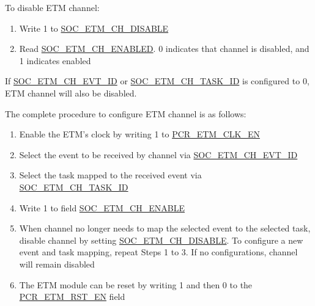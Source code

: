 \documentclass[main\_\_EN.tex]{subfiles}
\begin{document}
To disable ETM channel:
\begin{enumerate}
    \item Write 1 to \hyperref[fielddesc:SOCETMCHDISABLE0]{SOC\_ETM\_CH\_DISABLE}
    \item Read \hyperref[fielddesc:SOCETMCHENABLED0]{SOC\_ETM\_CH\_ENABLED}. 0 indicates that channel is disabled, and 1 indicates enabled
\end{enumerate}

If \hyperref[fielddesc:SOCETMCH0EVTID]{SOC\_ETM\_CH\_EVT\_ID}  or  \hyperref[fielddesc:SOCETMCH0TASKID]{SOC\_ETM\_CH\_TASK\_ID} is configured to 0, ETM channel will also be disabled.

The complete procedure to configure ETM channel is as follows:
\begin{enumerate}
    \item Enable the ETM's clock by writing 1 to \hyperref[fielddesc:PCRETMCLKEN]{PCR\_ETM\_CLK\_EN}
    \item Select the event to be received by channel via \hyperref[fielddesc:SOCETMCH0EVTID]{SOC\_ETM\_CH\_EVT\_ID}
    \item Select the task mapped to the received event via  \hyperref[fielddesc:SOCETMCH0TASKID]{SOC\_ETM\_CH\_TASK\_ID}
    \item Write 1 to field \hyperref[fielddesc:SOCETMCHENABLE0]{SOC\_ETM\_CH\_ENABLE}
    \item When channel no longer needs to map the selected event to the selected task, disable channel by setting \hyperref[fielddesc:SOCETMCHDISABLE0]{SOC\_ETM\_CH\_DISABLE}. To configure a new event and task mapping, repeat Steps 1 to 3. If no configurations, channel will remain disabled
    \item The ETM module can be reset by writing 1 and then 0 to the \hyperref[fielddesc:PCRETMRSTEN]{PCR\_ETM\_RST\_EN} field
\end{enumerate}



\end{document}
